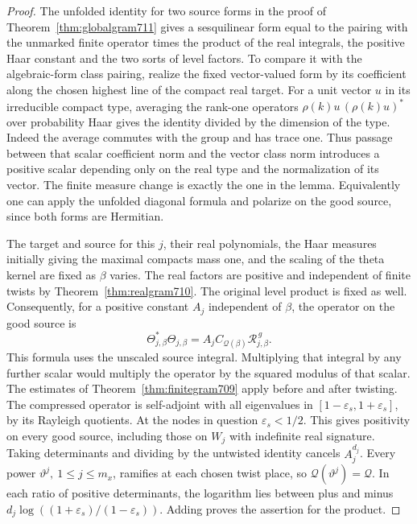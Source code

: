 \documentclass[a4paper,11pt]{article}
\theoremstyle{definition}
\theoremstyle{remark}
\numberwithin{equation}{section}
\begin{document}
\begin{proof}
The unfolded identity for two source forms in the proof of
Theorem~\ref{thm:globalgram711} gives a sesquilinear form equal
to the pairing with the unmarked finite operator times the
product of the real integrals, the positive Haar constant and
the two sorts of level factors. To compare it with the
algebraic-form class pairing, realize the fixed vector-valued
form by its coefficient along the chosen highest line of the
compact real target. For a unit vector \(u\) in its irreducible
compact type, averaging the rank-one operators
\(\rho(k)u\,(\rho(k)u)^*\) over probability Haar gives the
identity divided by the dimension of the type. Indeed the
average commutes with the group and has trace one. Thus passage
between that scalar coefficient norm and the vector class norm
introduces a positive scalar depending only on the real type
and the normalization of its vector. The finite measure
change is exactly the one in the lemma. Equivalently one can
apply the unfolded diagonal formula and polarize on the good
source, since both forms are Hermitian.

The target and source for this \(j\), their real polynomials,
the Haar measures initially giving the maximal compacts mass one,
and the scaling of the theta kernel are fixed as \(\beta\) varies.
The real factors are positive and independent of finite twists
by Theorem~\ref{thm:realgram710}. The original level product is
fixed as well. Consequently, for a positive constant \(A_j\)
independent of \(\beta\), the operator on the good source is
\[
       \Theta_{j,\beta}^*\Theta_{j,\beta}
             = A_j C_{\mathcal Q(\beta)}
                        \mathcal R_{j,\beta}^{\,g}.
\]
This formula uses the unscaled source integral. Multiplying that
integral by any further scalar would multiply the operator by
the squared modulus of that scalar. The estimates of
Theorem~\ref{thm:finitegram709} apply before and after twisting.
The compressed operator is self-adjoint with all eigenvalues in
\([1-\varepsilon_s,1+\varepsilon_s]\), by its Rayleigh quotients.
At the nodes in question \(\varepsilon_s<1/2\). This gives
positivity on every good source, including those on \(W_j\)
with indefinite real signature. Taking determinants and dividing
by the untwisted identity cancels \(A_j^{d_j}\).
Every power \(\vartheta^j,\ 1\le j\le m_x\), ramifies at each
chosen twist place, so \(\mathcal Q(\vartheta^j)=\mathcal Q\).
In each ratio of positive determinants, the logarithm lies
between plus and minus \(d_j\log((1+\varepsilon_s)/(1-\varepsilon_s))\).
Adding proves the assertion for the product.
\end{proof}
\end{document}
